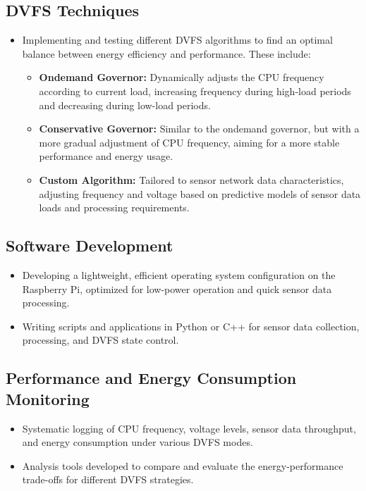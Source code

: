 \documentclass[twocolumn, 10pt]{article}
\begin{document}
\subsection*{DVFS Techniques}
\begin{itemize}
    \item Implementing and testing different DVFS algorithms to find an optimal balance between energy efficiency and performance. These include:
    \begin{itemize}
        \item \textbf{Ondemand Governor:} Dynamically adjusts the CPU frequency according to current load, increasing frequency during high-load periods and decreasing during low-load periods.
        \item \textbf{Conservative Governor:} Similar to the ondemand governor, but with a more gradual adjustment of CPU frequency, aiming for a more stable performance and energy usage.
        \item \textbf{Custom Algorithm:} Tailored to sensor network data characteristics, adjusting frequency and voltage based on predictive models of sensor data loads and processing requirements.
    \end{itemize}
\end{itemize}

\subsection*{Software Development}
\begin{itemize}
    \item Developing a lightweight, efficient operating system configuration on the Raspberry Pi, optimized for low-power operation and quick sensor data processing.
    \item Writing scripts and applications in Python or C++ for sensor data collection, processing, and DVFS state control.
\end{itemize}


\subsection*{Performance and Energy Consumption Monitoring}
\begin{itemize}
    \item Systematic logging of CPU frequency, voltage levels, sensor data throughput, and energy consumption under various DVFS modes.
    \item Analysis tools developed to compare and evaluate the energy-performance trade-offs for different DVFS strategies.
\end{itemize}
\end{document}
